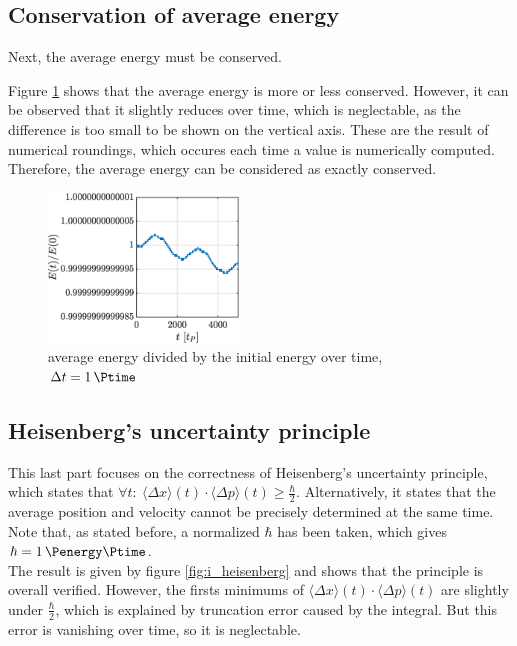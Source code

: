 \documentclass[a4paper,12pt,twoside]{article}
\begin{document}
  \subsection{Conservation of average energy}
    Next, the average energy must be conserved.

    Figure \ref{fig:i_E} shows that the average energy is more or less conserved.
    However, it can be observed that it slightly reduces over time, which is neglectable, as the difference is too small to be shown on the vertical axis.
    These are the result of numerical roundings, which occures each time a value is numerically computed.
    Therefore, the average energy can be considered as exactly conserved.

    \begin{figure}[h]
      \centering
      \includegraphics[width=0.45\textwidth]{graphs/i_E.eps}
      \caption{average energy divided by the initial energy over time, $\Delta t = \SI{1}{\Ptime}$}
      \label{fig:i_E}
    \end{figure}

  \subsection{Heisenberg's uncertainty principle}
    This last part focuses on the correctness of Heisenberg's uncertainty principle, which states that $\forall t:~\langle \Delta x \rangle(t)\cdot\langle \Delta p \rangle(t) \geq \frac{\hbar}{2}$.
    Alternatively, it states that the average position and velocity cannot be precisely determined at the same time.
    Note that, as stated before, a normalized $\hbar$ has been taken, which gives $\hbar=\SI{1}{\Penergy\Ptime}$.\\

    The result is given by figure \ref{fig:i_heisenberg} and shows that the principle is overall verified.
    However, the firsts minimums of $\langle \Delta x \rangle(t)\cdot\langle \Delta p \rangle(t)$ are slightly under $\frac{\hbar}{2}$, which is explained by truncation error caused by the integral.
    But this error is vanishing over time, so it is neglectable.
\end{document}
